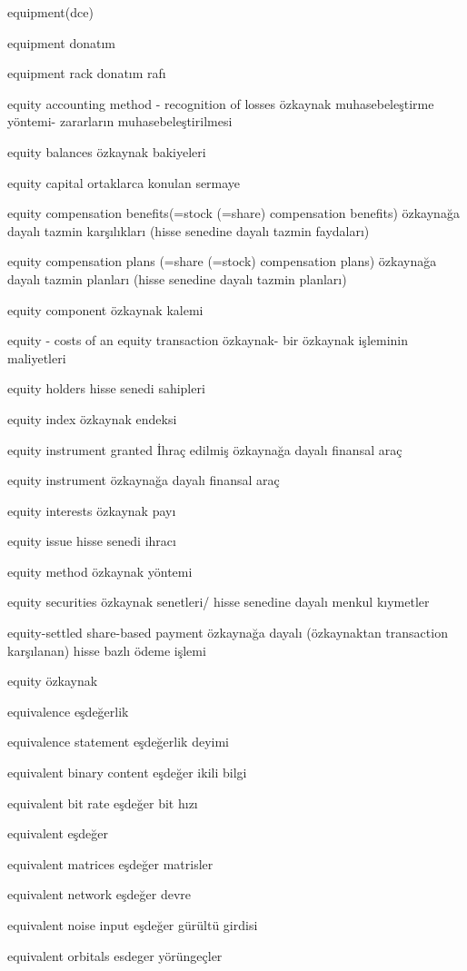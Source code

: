 \documentclass[12pt,fleqn]{article}\usepackage{../../common}
\begin{document}
equipment(dce)

equipment donatım

equipment rack donatım rafı

equity accounting method - recognition of losses özkaynak muhasebeleştirme yöntemi- zararların muhasebeleştirilmesi

equity balances özkaynak bakiyeleri

equity capital ortaklarca konulan sermaye

equity compensation benefits(=stock (=share) compensation benefits) özkaynağa dayalı tazmin karşılıkları (hisse senedine dayalı tazmin faydaları)

equity compensation plans (=share (=stock) compensation plans) özkaynağa dayalı tazmin planları (hisse senedine dayalı tazmin planları)

equity component özkaynak kalemi

equity - costs of an equity transaction özkaynak- bir özkaynak işleminin maliyetleri

equity holders hisse senedi sahipleri

equity index özkaynak endeksi

equity instrument granted İhraç edilmiş özkaynağa dayalı finansal araç

equity instrument özkaynağa dayalı finansal araç

equity interests özkaynak payı

equity issue hisse senedi ihracı

equity method özkaynak yöntemi

equity securities özkaynak senetleri/ hisse senedine dayalı menkul kıymetler

equity-settled share-based payment özkaynağa dayalı (özkaynaktan transaction karşılanan) hisse bazlı ödeme işlemi

equity özkaynak

equivalence eşdeğerlik

equivalence statement eşdeğerlik deyimi

equivalent binary content eşdeğer ikili bilgi

equivalent bit rate eşdeğer bit hızı

equivalent eşdeğer

equivalent matrices eşdeğer matrisler

equivalent network eşdeğer devre

equivalent noise input eşdeğer gürültü girdisi

equivalent orbitals esdeger yörüngeçler
\end{document}
